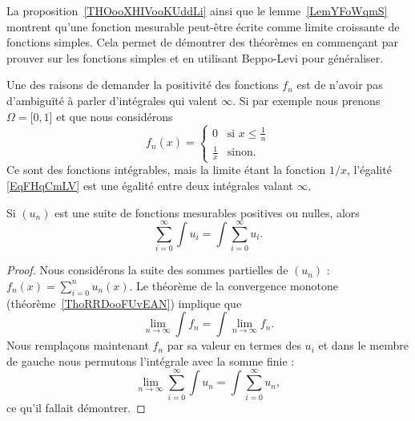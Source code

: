 \begin{remark}
    La proposition~\ref{THOooXHIVooKUddLi} ainsi que le lemme~\ref{LemYFoWqmS} montrent qu'une fonction mesurable peut-être écrite comme limite croissante de fonctions simples. Cela permet de démontrer des théorèmes en commençant par prouver sur les fonctions simples et en utilisant Beppo-Levi pour généraliser.
\end{remark}

\begin{remark}
    Une des raisons de demander la positivité des fonctions \( f_n\) est de n'avoir pas d'ambiguïté à parler d'intégrales qui valent \( \infty\). Si par exemple nous prenons \( \Omega=\mathopen[ 0 , 1 \mathclose]\) et que nous considérons
    \begin{equation}
        f_n(x)=\begin{cases}
            0    &   \text{si } x\leq \frac{1}{ n }\\
            \frac{1}{ x }    &    \text{sinon}.
        \end{cases}
    \end{equation}
    Ce sont des fonctions intégrables, mais la limite étant la fonction \( 1/x\), l'égalité \eqref{EqFHqCmLV} est une égalité entre deux intégrales valant \( \infty\).
\end{remark}

\begin{corollary} \label{CorNKXwhdz}
    Si \( (u_n)\) est une suite de fonctions mesurables positives ou nulles, alors
    \begin{equation}
        \sum_{i=0}^{\infty}\int u_i=\int\sum_{i=0}^{\infty}u_i.
    \end{equation}
\end{corollary}

\begin{proof}
    Nous considérons la suite des sommes partielles de \( (u_n)\) : \( f_n(x)=\sum_{i=0}^nu_n(x)\). Le théorème de la convergence monotone (théorème~\ref{ThoRRDooFUvEAN}) implique que
    \begin{equation}
        \lim_{n\to \infty} \int f_n=\int\lim_{n\to \infty} f_n.
    \end{equation}
    Nous remplaçons maintenant \( f_n\) par sa valeur en termes des \( u_i\) et dans le membre de gauche nous permutons l'intégrale avec la somme finie :
    \begin{equation}
        \lim_{n\to \infty} \sum_{i=0}^{\infty}\int u_n=\int\sum_{i=0}^{\infty}u_n,
    \end{equation}
    ce qu'il fallait démontrer.
\end{proof}

